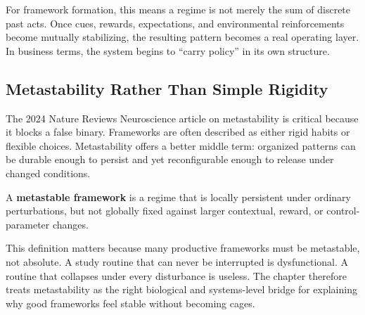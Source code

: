 For framework formation, this means a regime is not merely the sum of discrete
past acts. Once cues, rewards, expectations, and environmental reinforcements
become mutually stabilizing, the resulting pattern becomes a real operating
layer. In business terms, the system begins to ``carry policy'' in its own
structure.

\subsection{Metastability Rather Than Simple Rigidity}

The 2024 Nature Reviews Neuroscience article on metastability is critical
because it blocks a false binary. Frameworks are often described as either
rigid habits or flexible choices. Metastability offers a better middle term:
organized patterns can be durable enough to persist and yet reconfigurable
enough to release under changed conditions.

\begin{definition}
A \textbf{metastable framework} is a regime that is locally persistent under
ordinary perturbations, but not globally fixed against larger contextual,
reward, or control-parameter changes.
\end{definition}

\begin{discussion}
This definition matters because many productive frameworks must be metastable,
not absolute. A study routine that can never be interrupted is dysfunctional.
A routine that collapses under every disturbance is useless. The chapter
therefore treats metastability as the right biological and systems-level bridge
for explaining why good frameworks feel stable without becoming cages.
\end{discussion}
